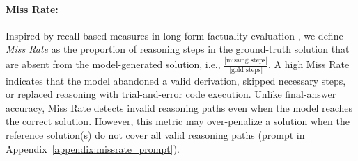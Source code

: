 \documentclass[11pt]{article}
\begin{document}
\paragraph{Miss Rate:}
\label{sec:miss_rate}
Inspired by recall-based measures in long-form factuality evaluation \citep{safe, liu-etal-2025-verifact}, we define \textit{Miss Rate} as the proportion of reasoning steps in the ground-truth solution that are absent from the model-generated solution, i.e., $\frac{|\text{missing steps}|}{|\text{gold steps}|}$. A high Miss Rate indicates that the model abandoned a valid derivation, skipped necessary steps, or replaced reasoning with trial-and-error code execution. Unlike final-answer accuracy, Miss Rate detects invalid reasoning paths even when the model reaches the correct solution. However, this metric may over-penalize a solution when the reference solution(s) do not cover all valid reasoning paths (prompt in Appendix~\ref{appendix:missrate_prompt}).

\end{document}
